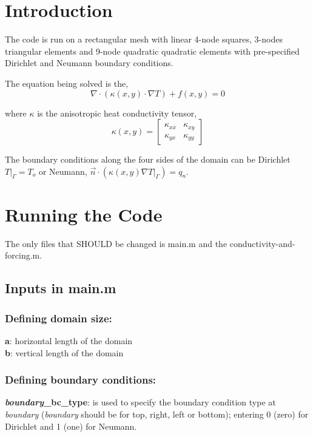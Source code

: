 \section*{Introduction}

\par The code is run on a rectangular mesh with linear 4-node squares, 3-nodes triangular elements and 9-node quadratic quadratic elements with pre-specified Dirichlet and Neumann boundary conditions.

The equation being solved is the,
\begin{equation}
\nabla \cdot (\kappa (x,y) \cdot \nabla T) + f(x,y) = 0
\end{equation}

where $\kappa$ is the anisotropic heat conductivity tensor,
\[
\kappa (x,y) = \begin{bmatrix}
     \kappa_{xx} & \kappa_{xy} \\
     \kappa_{yx} & \kappa_{yy} \end{bmatrix}
     \]
     
The boundary conditions along the four sides of the domain can be Dirichlet $T|_{\Gamma} = T_o$ or Neumann, $\vec{n}\cdot(\kappa (x,y) \nabla T|_{\Gamma}) = q_n$.

\section*{Running the Code}

\par The only files that SHOULD be changed is main.m and the conductivity-and-forcing.m.
\subsection*{Inputs in main.m}
\subsubsection*{Defining domain size:}
\textbf{a}: horizontal length of the domain \\
\textbf{b}: vertical length of the domain \\

\subsubsection*{Defining boundary conditions:}
\textbf{\textit{boundary}\_bc\_type}: is used to specify the boundary condition type at \textit{boundary} (\textit{boundary} should be for top, right, left or bottom); entering 0 (zero) for Dirichlet and 1 (one) for Neumann. \\


